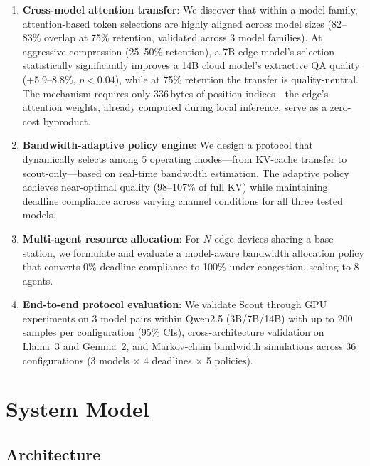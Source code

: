 \documentclass[conference]{IEEEtran}
\begin{document}
\begin{enumerate}
    \item \textbf{Cross-model attention transfer}: We discover that within a model family, attention-based token selections are highly aligned across model sizes (82--83\% overlap at 75\% retention, validated across 3 model families).
    At aggressive compression (25--50\% retention), a 7B edge model's selection statistically significantly improves a 14B cloud model's extractive QA quality ($+$5.9--8.8\%, $p < 0.04$), while at 75\% retention the transfer is quality-neutral.
    The mechanism requires only 336\,bytes of position indices---the edge's attention weights, already computed during local inference, serve as a zero-cost byproduct.

    \item \textbf{Bandwidth-adaptive policy engine}: We design a protocol that dynamically selects among 5 operating modes---from KV-cache transfer to scout-only---based on real-time bandwidth estimation.
    The adaptive policy achieves near-optimal quality (98--107\% of full KV) while maintaining deadline compliance across varying channel conditions for all three tested models.

    \item \textbf{Multi-agent resource allocation}: For $N$ edge devices sharing a base station, we formulate and evaluate a model-aware bandwidth allocation policy that converts 0\% deadline compliance to 100\% under congestion, scaling to 8 agents.

    \item \textbf{End-to-end protocol evaluation}: We validate Scout through GPU experiments on 3 model pairs within Qwen2.5 (3B/7B/14B) with up to 200 samples per configuration (95\% CIs), cross-architecture validation on Llama~3 and Gemma~2, and Markov-chain bandwidth simulations across 36 configurations (3 models $\times$ 4 deadlines $\times$ 5 policies).
\end{enumerate}


\section{System Model}
\label{sec:system}

\subsection{Architecture}
\end{document}
